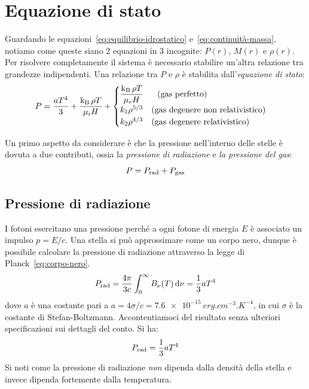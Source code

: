 \section{Equazione di stato}\label{sec:equazione-stato}
Guardando le equazioni~\eqref{eq:equilibrio-idrostatico} e~\eqref{eq:continuità-massa}, notiamo come queste siano 2 equazioni in 3 incognite: $P(r)$, $M(r)$ e $\rho(r)$. Per risolvere completamente il sistema è necessario stabilire un'altra relazione tra grandezze indipendenti. Una relazione tra $P$ e $\rho$ è stabilita dall'\emph{equazione di stato}:
\begin{equation}\label{eq:equazione-stato}
    P = \dfrac{aT^4}{3} + \dfrac{\operatorname{k_B} \rho T}{\mu_i H} + 
    \begin{cases} 
    \dfrac{\operatorname{k_B} \rho T}{\mu_e H} \quad \, \, \, \,   \textup{(gas perfetto)} \\ 
    k_1 \rho^{5/3} \quad \textup{(gas degenere non relativistico)} \\ 
    k_2 \rho^{4/3} \quad \textup{(gas degenere relativistico)}
    \end{cases}
\end{equation}

Un primo aspetto da considerare è che la pressione nell'interno delle stelle è dovuta a due contributi, ossia la \emph{pressione di radiazione} e \emph{la pressione del gas}:
\[
P = P_\textup{rad} + P_\textup{gas}
\]
\subsection{Pressione di radiazione}
I fotoni esercitano una pressione perché a ogni fotone di energia $E$ è associato un impulso $p = E / c$. Una stella si può approssimare come un corpo nero, dunque è possibile calcolare la pressione di radiazione attraverso la legge di Planck~\eqref{eq:corpo-nero}.
\[
P_\textup{rad} = \frac{4\pi}{3c}\int_0^\infty B_\nu(T) \mathop{\mathrm{{}d}}\mathopen{} \nu = \frac{1}{3} a T^4
\]
dove $a$ è una costante pari a $a = 4 \sigma / c = \SI{7.6e-15}{erg.cm^{-3}.K^{-4}}$, in cui $\sigma$ è la costante di Stefan-Boltzmann. Accontentiamoci del risultato senza ulteriori specificazioni sui dettagli del conto. Si ha:
\begin{equation}\label{eq:pressione-radiazione}
    P_\textup{rad} = \frac{1}{3} a T^4
\end{equation}
Si noti come la pressione di radiazione \emph{non} dipenda dalla densità della stella e invece dipenda fortemente dalla temperatura.

